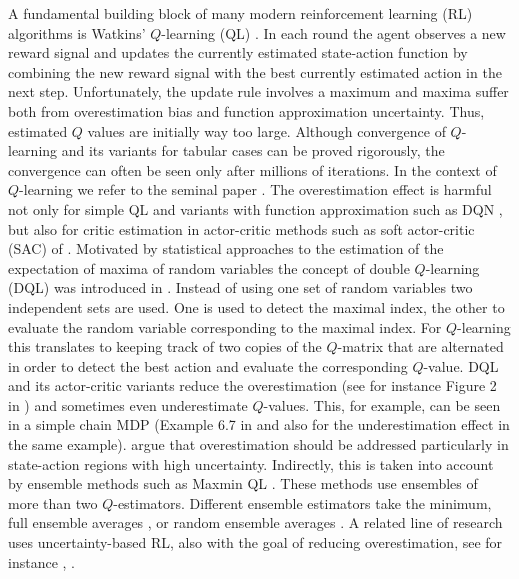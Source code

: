 \documentclass{article}
\theoremstyle{plain}
\theoremstyle{definition}
\theoremstyle{remark}
\begin{document}
A fundamental building block of many modern reinforcement learning (RL) algorithms is Watkins' $Q$-learning (QL) \cite{Watkins1992}. In each round the agent observes a new reward signal and updates the currently estimated state-action function by combining the new reward signal with the best currently estimated action in the next step. Unfortunately, the update rule involves a maximum and maxima suffer both from overestimation bias and function approximation uncertainty. Thus, estimated $Q$ values are initially way too large. Although convergence of $Q$-learning and its variants for tabular cases can be proved rigorously, the convergence can often be seen only after millions of iterations. In the context of $Q$-learning we refer to the seminal paper \cite{Thrun+Schwartz:1993}. The overestimation effect is harmful not only for simple QL and variants with function approximation such as DQN \cite{dqn}, but also for critic estimation in actor-critic methods such as soft actor-critic (SAC) of \cite{sac}. Motivated by statistical approaches to the estimation of the expectation of maxima of random variables the concept of double $Q$-learning (DQL) was introduced in \cite{hasselt2010}. Instead of using one set of random variables two independent sets are used. One is used to detect the maximal index, the other to evaluate the random variable corresponding to the maximal index. For $Q$-learning this translates to keeping track of two copies of the $Q$-matrix that are alternated in order to detect the best action and evaluate the corresponding $Q$-value. DQL and its actor-critic variants reduce the overestimation (see for instance Figure 2 in \cite{fujimoto2018addressing}) and sometimes even underestimate $Q$-values. This, for example, can be seen in a simple chain MDP (Example 6.7 in \cite{Sutton1998} and also \cite{Maxmin} for the underestimation effect in the same example). \cite{fujimoto2018addressing} argue that overestimation should be addressed particularly in state-action regions with high uncertainty. Indirectly, this is taken into account by ensemble methods such as Maxmin QL \cite{Maxmin}. These methods use ensembles of more than two $Q$-estimators. Different ensemble estimators take the minimum, full ensemble averages \cite{averagedQ}, or random ensemble averages \cite{redq}. A related line of research uses uncertainty-based RL, also with the goal of reducing overestimation, see for instance \cite{Wu}, \cite{Ghas}.
\end{document}
